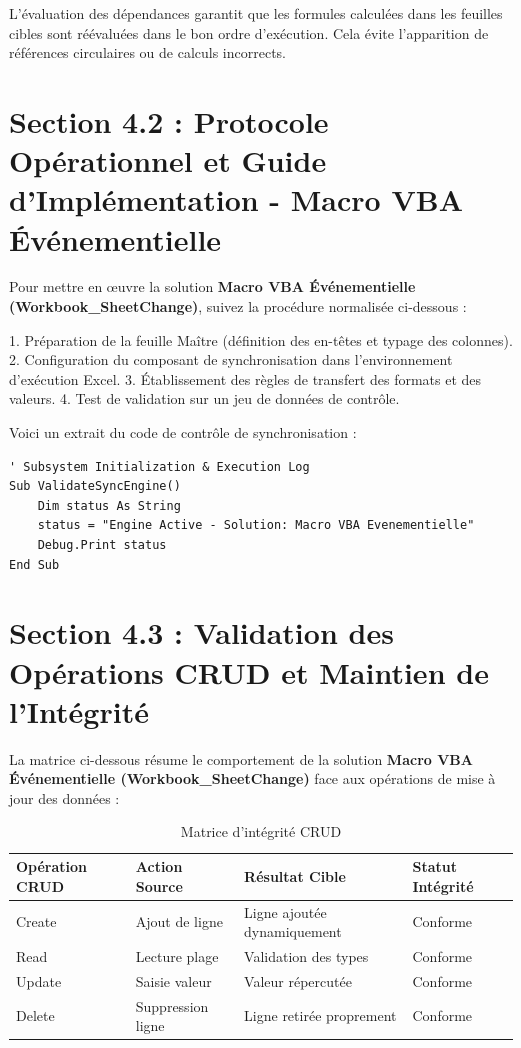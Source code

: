 \documentclass[12pt,a4paper]{report}
\begin{document}
L'évaluation des dépendances garantit que les formules calculées dans les feuilles cibles sont réévaluées dans le bon ordre d'exécution. Cela évite l'apparition de références circulaires ou de calculs incorrects.


\section{Section 4.2 : Protocole Opérationnel et Guide d'Implémentation - Macro VBA Événementielle}
Pour mettre en œuvre la solution \textbf{Macro VBA Événementielle (Workbook\_SheetChange)}, suivez la procédure normalisée ci-dessous :

1. Préparation de la feuille Maître (définition des en-têtes et typage des colonnes).
2. Configuration du composant de synchronisation dans l'environnement d'exécution Excel.
3. Établissement des règles de transfert des formats et des valeurs.
4. Test de validation sur un jeu de données de contrôle.

Voici un extrait du code de contrôle de synchronisation :
\begin{lstlisting}[caption=Code de controle operationnel]
' Subsystem Initialization & Execution Log
Sub ValidateSyncEngine()
    Dim status As String
    status = "Engine Active - Solution: Macro VBA Evenementielle"
    Debug.Print status
End Sub
\end{lstlisting}


\section{Section 4.3 : Validation des Opérations CRUD et Maintien de l'Intégrité}
La matrice ci-dessous résume le comportement de la solution \textbf{Macro VBA Événementielle (Workbook\_SheetChange)} face aux opérations de mise à jour des données :

\begin{table}[h]
\centering
\begin{tabular}{@{}llll@{}}
\toprule
\textbf{Opération CRUD} & \textbf{Action Source} & \textbf{Résultat Cible} & \textbf{Statut Intégrité} \\ \midrule
Create & Ajout de ligne & Ligne ajoutée dynamiquement & Conforme \\
Read & Lecture plage & Validation des types & Conforme \\
Update & Saisie valeur & Valeur répercutée & Conforme \\
Delete & Suppression ligne & Ligne retirée proprement & Conforme \\ \bottomrule
\end{tabular}
\caption{Matrice d'intégrité CRUD}
\end{table}
\end{document}
